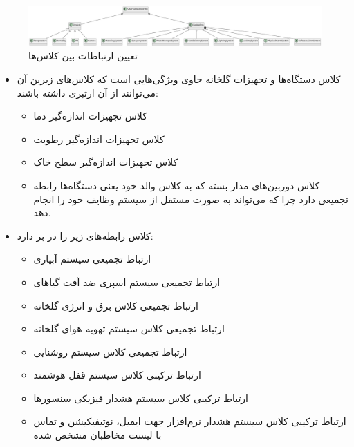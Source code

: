 \documentclass[a4paper]{report}
\begin{document}
\begin{figure}[H]
    \centering
    \includegraphics[width=1.0\textwidth]{assets/classes/soilMonitoring.png}
    \caption{تعیین ارتباطات بین کلاس‌ها}
\end{figure}

\begin{itemize}
    \item کلاس دستگاه‌ها و تجهیزات گلخانه حاوی ویژگی‌هایی است که کلاس‌های زیرین
    آن می‌توانند از آن ارثبری داشته باشند:
    \begin{itemize}
        \item کلاس تجهیزات اندازه‌گیر دما
        \item کلاس تجهیزات اندازه‌گیر رطوبت
        \item کلاس تجهیزات اندازه‌گیر سطح  خاک
        \item کلاس دوربین‌های مدار بسته که به کلاس والد خود یعنی دستگاه‌ها رابطه
        تجمیعی دارد چرا که می‌تواند به صورت مستقل از سیستم وظایف خود را انجام
        دهد.
    \end{itemize}
    \item کلاس  رابطه‌های زیر را در بر دارد:
    \begin{itemize}
        \item ارتباط تجمیعی سیستم آبیاری 
        \item ارتباط تجمیعی سیستم اسپری ضد آفت گیاهای
        \item ارتباط تجمیعی کلاس برق و انرژی گلخانه
        \item ارتباط تجمیعی کلاس سیستم تهویه هوای گلخانه
        \item ارتباط تجمیعی کلاس سیستم روشنایی
        \item ارتباط ترکیبی کلاس سیستم قفل هوشمند 
        \item ارتباط ترکیبی کلاس سیستم هشدار فیزیکی سنسور‌ها
        \item ارتباط ترکیبی کلاس سیستم هشدار نرم‌افزار جهت ایمیل، نوتیفیکیشن و
        تماس با لیست مخاطبان مشخص شده
    \end{itemize}
\end{itemize}
\end{document}
